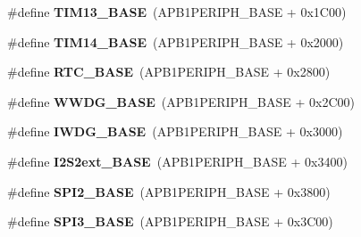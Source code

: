 \begin{DoxyCompactItemize}
\item 
\hypertarget{group___peripheral__memory__map_gad20f79948e9359125a40bbf6ed063590}{\#define {\bfseries T\-I\-M13\-\_\-\-B\-A\-S\-E}~(A\-P\-B1\-P\-E\-R\-I\-P\-H\-\_\-\-B\-A\-S\-E + 0x1\-C00)}\label{group___peripheral__memory__map_gad20f79948e9359125a40bbf6ed063590}

\item 
\hypertarget{group___peripheral__memory__map_ga862855347d6e1d92730dfe17ee8e90b8}{\#define {\bfseries T\-I\-M14\-\_\-\-B\-A\-S\-E}~(A\-P\-B1\-P\-E\-R\-I\-P\-H\-\_\-\-B\-A\-S\-E + 0x2000)}\label{group___peripheral__memory__map_ga862855347d6e1d92730dfe17ee8e90b8}

\item 
\hypertarget{group___peripheral__memory__map_ga4265e665d56225412e57a61d87417022}{\#define {\bfseries R\-T\-C\-\_\-\-B\-A\-S\-E}~(A\-P\-B1\-P\-E\-R\-I\-P\-H\-\_\-\-B\-A\-S\-E + 0x2800)}\label{group___peripheral__memory__map_ga4265e665d56225412e57a61d87417022}

\item 
\hypertarget{group___peripheral__memory__map_ga9a5bf4728ab93dea5b569f5b972cbe62}{\#define {\bfseries W\-W\-D\-G\-\_\-\-B\-A\-S\-E}~(A\-P\-B1\-P\-E\-R\-I\-P\-H\-\_\-\-B\-A\-S\-E + 0x2\-C00)}\label{group___peripheral__memory__map_ga9a5bf4728ab93dea5b569f5b972cbe62}

\item 
\hypertarget{group___peripheral__memory__map_ga8543ee4997296af5536b007cd4748f55}{\#define {\bfseries I\-W\-D\-G\-\_\-\-B\-A\-S\-E}~(A\-P\-B1\-P\-E\-R\-I\-P\-H\-\_\-\-B\-A\-S\-E + 0x3000)}\label{group___peripheral__memory__map_ga8543ee4997296af5536b007cd4748f55}

\item 
\hypertarget{group___peripheral__memory__map_gaa5f7b241ed5b756decd835300c9e7bc9}{\#define {\bfseries I2\-S2ext\-\_\-\-B\-A\-S\-E}~(A\-P\-B1\-P\-E\-R\-I\-P\-H\-\_\-\-B\-A\-S\-E + 0x3400)}\label{group___peripheral__memory__map_gaa5f7b241ed5b756decd835300c9e7bc9}

\item 
\hypertarget{group___peripheral__memory__map_gac3e357b4c25106ed375fb1affab6bb86}{\#define {\bfseries S\-P\-I2\-\_\-\-B\-A\-S\-E}~(A\-P\-B1\-P\-E\-R\-I\-P\-H\-\_\-\-B\-A\-S\-E + 0x3800)}\label{group___peripheral__memory__map_gac3e357b4c25106ed375fb1affab6bb86}

\item 
\hypertarget{group___peripheral__memory__map_gae634fe8faa6922690e90fbec2fc86162}{\#define {\bfseries S\-P\-I3\-\_\-\-B\-A\-S\-E}~(A\-P\-B1\-P\-E\-R\-I\-P\-H\-\_\-\-B\-A\-S\-E + 0x3\-C00)}\label{group___peripheral__memory__map_gae634fe8faa6922690e90fbec2fc86162}


\end{DoxyCompactItemize}
